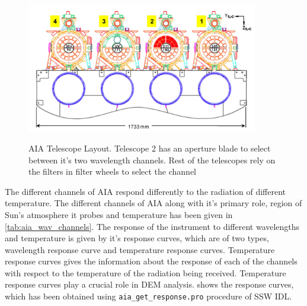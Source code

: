 \message{ !name(main.tex)}\documentclass[12pt]{article}
\begin{document}
\begin{figure}[h!]
    \centering
    \includegraphics[width=0.9\textwidth]{images/AIA_telescope_layout.png}
    \caption[AIA Telescope Layout]{AIA Telescope Layout. Telescope 2 has an aperture blade to select between it's two wavelength channels. Rest of the telescopes rely on the filters in filter wheels to select the channel }
    {\label{fig:aia_telescope_layout}}
\end{figure}

The different channels of AIA respond differently to the radiation of different temperature. The different channels of AIA along with it's primary role, region of Sun's atmosphere it probes and temperature has been given in \cref{tab:aia_wav_channels}. The response of the instrument to different wavelengths and temperature is given by it's response curves, which are of two types, wavelength response curve and temperature response curves. Temperature response curves gives the information about the response of each of the channels with respect to the temperature of the radiation being received. Temperature response curves play a crucial role in DEM analysis.  shows the response curves, which has been obtained using \texttt{aia\_get\_response.pro} procedure of SSW IDL.
\end{document}
